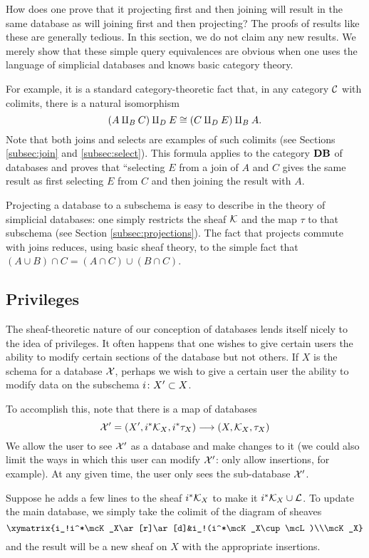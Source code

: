 \documentclass{amsart}
\def\Data{{\bf DB}}
\begin{document}
How does one prove that it projecting first and then joining will result in the same database as will joining first and then projecting?  The proofs of results like these are generally tedious.  In this section, we do not claim any new results.  We merely show that these simple query equivalences are obvious when one uses the language of simplicial databases and knows basic category theory. 

For example, it is a standard category-theoretic fact that, in any category $\mathcal{C}$ with colimits, there is a natural isomorphism $$(A\amalg_BC)\amalg_DE\cong (C\amalg_DE)\amalg_BA.$$  Note that both joins and selects are examples of such colimits (see Sections \ref{subsec:join} and \ref{subsec:select}).  This formula applies to the category $\Data$ of databases and proves that ``selecting $E$ from a join of $A$ and $C$ gives the same result as first selecting $E$ from $C$ and then joining the result with $A$.

Projecting a database to a subschema is easy to describe in the theory of simplicial databases: one simply restricts the sheaf $\mathcal{K}$ and the map $\tau$ to that subschema (see Section \ref{subsec:projections}).  The fact that projects commute with joins reduces, using basic sheaf theory, to the simple fact that $(A\cup B)\cap C=(A\cap C)\cup (B\cap C)$.  

\subsection{Privileges}\label{subsec:privileges}

The sheaf-theoretic nature of our conception of databases lends itself nicely to the idea of privileges.  It often happens that one wishes to give certain users the ability to modify certain sections of the database but not others.  If $X$ is the schema for a database $\mathcal{X}$, perhaps we wish to give a certain user the ability to modify data on the subschema $i\colon X'\subset X$.  

To accomplish this, note that there is a map of databases $$\mathcal{X}'=(X',i^*\mathcal{K}_X,i^*\tau_X)\longrightarrow(X,\mathcal{K}_X,\tau_X)$$  We allow the user to see $\mathcal{X}'$ as a database and make changes to it (we could also limit the ways in which this user can modify $\mathcal{X}'$: only allow insertions, for example).  At any given time, the user only sees the sub-database $\mathcal{X}'$.  

Suppose he adds a few lines to the sheaf $i^*\mathcal{K}_X$ to make it $i^*\mathcal{K}_X\cup\mathcal{L}$.  To update the main database, we simply take the colimit of the diagram of sheaves $$\xymatrix{i_!i^*\mcK_X\ar[r]\ar[d]&i_!(i^*\mcK_X\cup\mcL)\\\mcK_X}$$ and the result will be a new sheaf on $X$ with the appropriate insertions.  
\end{document}
